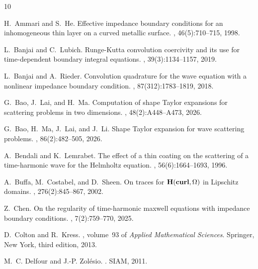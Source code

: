 \documentclass[12pt,reqno]{amsart}
\theoremstyle{definition}
\numberwithin{equation}{section}
\begin{document}
\begin{thebibliography}{10}

H.~Ammari and S.~He.
\newblock Effective impedance boundary conditions for an inhomogeneous thin
  layer on a curved metallic surface.
, 46(5):710--715, 1998.

L.~Banjai and C.~Lubich.
\newblock Runge-{K}utta convolution coercivity and its use for time-dependent
  boundary integral equations.
, 39(3):1134--1157, 2019.

L.~Banjai and A.~Rieder.
\newblock Convolution quadrature for the wave equation with a nonlinear
  impedance boundary condition.
, 87(312):1783--1819, 2018.

G.~Bao, J.~Lai, and H.~Ma.
\newblock Computation of shape {T}aylor expansions for scattering problems in
  two dimensions.
, 48(2):A448--A473, 2026.

G.~Bao, H.~Ma, J.~Lai, and J.~Li.
\newblock Shape {T}aylor expansion for wave scattering problems.
, 86(2):482--505, 2026.

A.~Bendali and K.~Lemrabet.
\newblock The effect of a thin coating on the scattering of a time-harmonic
  wave for the {H}elmholtz equation.
, 56(6):1664--1693, 1996.

A.~Buffa, M.~Costabel, and D.~Sheen.
\newblock On traces for {${\bf H}({\bf curl},\Omega)$} in {L}ipschitz domains.
, 276(2):845--867, 2002.

Z.~Chen.
\newblock On the regularity of time-harmonic maxwell equations with impedance
  boundary conditions.
,
  7(2):759--770, 2025.

D.~Colton and R.~Kress.
,
  volume~93 of {\em Applied Mathematical Sciences}.
\newblock Springer, New York, third edition, 2013.

M.~C. Delfour and J.-P. Zol{\'e}sio.
.
\newblock SIAM, 2011.


\end{thebibliography}
\end{document}
